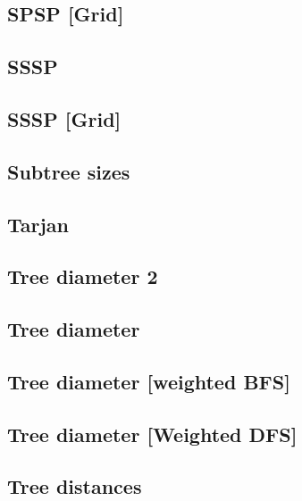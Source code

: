 \subsection{SPSP [Grid]}
\raggedbottom
\hrulefill
\subsection{SSSP}
\raggedbottom
\hrulefill
\subsection{SSSP [Grid]}
\raggedbottom
\hrulefill
\subsection{Subtree sizes}
\raggedbottom
\hrulefill
\subsection{Tarjan}
\raggedbottom
\hrulefill
\subsection{Tree diameter 2}
\raggedbottom
\hrulefill
\subsection{Tree diameter}
\raggedbottom
\hrulefill
\subsection{Tree diameter [weighted BFS]}
\raggedbottom
\hrulefill
\subsection{Tree diameter [Weighted DFS]}
\raggedbottom
\hrulefill
\subsection{Tree distances}
\raggedbottom
\hrulefill

